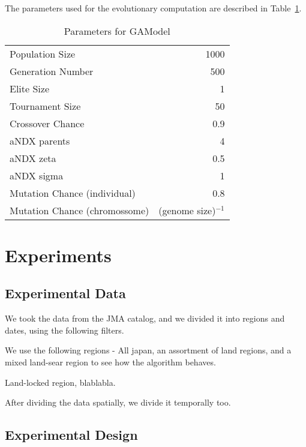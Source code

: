 \documentclass{sig-alternate}
\begin{document}
The parameters used for the evolutionary computation are described in
Table~\ref{GAParameters}. %

\begin{table}[!h]
  \begin{center}
  \begin{tabular}{|l|r|}
    \hline
    Population Size & 1000\\
    Generation Number & 500\\
    Elite Size & 1\\
    Tournament Size & 50\\
    Crossover Chance & 0.9\\
    aNDX parents & 4\\
    aNDX zeta & 0.5\\
    aNDX sigma & 1\\
    Mutation Chance (individual) & 0.8\\
    Mutation Chance (chromossome) & (genome size)$^{-1}$\\
    \hline    
  \end{tabular}
  \end{center}
  \caption{Parameters for GAModel}
  \label{GAParameters}
\end{table}


\section{Experiments}

\subsection{Experimental Data}

We took the data from the JMA catalog, and we divided it into regions
and dates, using the following filters.

We use the following regions - All japan, an assortment of land
regions, and a mixed land-sear region to see how the algorithm
behaves.

Land-locked region, blablabla.

After dividing the data spatially, we divide it temporally too.


\subsection{Experimental Design}
\end{document}
